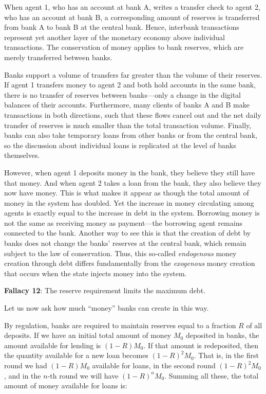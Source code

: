When agent 1, who has an account at bank A, writes a transfer check to agent 2, who has an account at bank B, a corresponding amount of reserves is transferred from bank A to bank B at the central bank. Hence, interbank transactions represent yet another layer of the monetary economy above individual transactions. The conservation of money applies to bank reserves, which are merely transferred between banks.

Banks support a volume of transfers far greater than the volume of their reserves. If agent 1 transfers money to agent 2 and both hold accounts in the same bank, there is no transfer of reserves between banks—only a change in the digital balances of their accounts. Furthermore, many clients of banks A and B make transactions in both directions, such that these flows cancel out and the net daily transfer of reserves is much smaller than the total transaction volume. Finally, banks can also take temporary loans from other banks or from the central bank, so the discussion about individual loans is replicated at the level of banks themselves.

However, when agent 1 deposits money in the bank, they believe they still have that money. And when agent 2 takes a loan from the bank, they also believe they now have money. This is what makes it appear as though the total amount of money in the system has doubled. Yet the increase in money circulating among agents is exactly equal to the increase in debt in the system. Borrowing money is not the same as receiving money as payment—the borrowing agent remains connected to the bank. Another way to see this is that the creation of debt by banks does not change the banks’ reserves at the central bank, which remain subject to the law of conservation. Thus, this so-called \textit{endogenous} money creation through debt differs fundamentally from the \textit{exogenous} money creation that occurs when the state injects money into the system.

\textbf{Fallacy 12}: The reserve requirement limits the maximum debt.

 Let us now ask how much “money” banks can create in this way.

 By regulation, banks are required to maintain reserves equal to a fraction $R$ of all deposits.   If we have an initial total amount of money $M_0$ deposited in banks, the amount available for lending is $(1 - R)M_0$.  If that amount is redeposited, then the quantity available for a new loan becomes $(1 - R)^2 M_0$. That is, in the first round we had $(1 - R)M_0$ available for loans, in the second round $(1 - R)^2 M_0$, and in the $n$-th round we will have $(1 - R)^n M_0$.   Summing all these, the total amount of money available for loans is:


